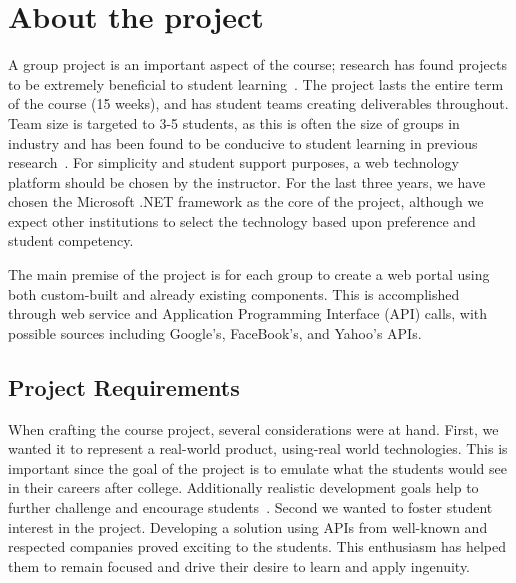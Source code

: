 \documentclass[conference]{IEEEtran}
\begin{document}
\section{About the project}
\label{sec: aboutproject}

A group project is an important aspect of the course; research has found projects to be extremely beneficial to student learning~\cite{Schummer:2005:TDS:1149293.1149369,Guo:2009:GPS:1516546.1516579,Coppit:2005:LTP:1047124.1047400}. The project lasts the entire term of the course (15 weeks), and has student teams creating deliverables throughout. Team size is targeted to 3-5 students, as this is often the size of groups in industry and has been found to be conducive to student learning in previous research~\cite{Guo:2009:GPS:1516546.1516579,Petkovic:2006:TPS:1140124.1140202}. For simplicity and student support purposes, a web technology platform should be chosen by the instructor. For the last three years, we have chosen the Microsoft .NET framework as the core of the project, although we expect other institutions to select the technology based upon preference and student competency.

The main premise of the project is for each group to create a web portal using both custom-built and already existing components.  This is accomplished through web service and Application Programming Interface (API) calls, with possible sources including Google's, FaceBook's, and Yahoo's APIs.

\subsection{Project Requirements}

When crafting the course project, several considerations were at hand. First, we wanted it to represent a real-world product, using-real world technologies. This is important since the goal of the project is to emulate what the students would see in their careers after college. Additionally realistic development goals help to further challenge and encourage students~\cite{Schummer:2005:TDS:1149293.1149369,Marmorstein:2011:OSC:1999747.1999823,Tadayon:2004:SEB:1050231.1050248,VanderDuim:2007:GPE:1248820.1248900,Hayes:2002:ESE:872751.873465}. Second we wanted to foster student interest in the project. Developing a solution using APIs from well-known and respected companies proved exciting to the students. This enthusiasm has helped them to remain focused and drive their desire to learn and apply ingenuity.
\end{document}
